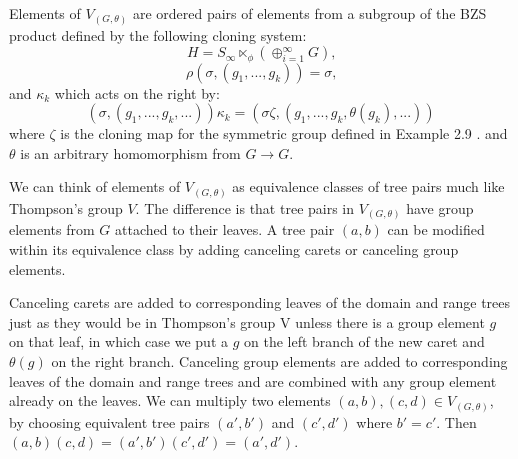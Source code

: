 \documentclass[11pt]{amsart}
\theoremstyle{plain}
\theoremstyle{remark}
\theoremstyle{definition}
\theoremstyle{remark}
\theoremstyle{named}
\begin{document}
Elements of $V_{(G,\theta)}$ are ordered pairs of elements from a subgroup of the BZS product defined by the following cloning system:
\[H = S_{\infty} \ltimes_\phi (\oplus^{\infty}_{i=1} G) \text{,}\]
\[\rho(\sigma, (g_1, ... , g_k))=\sigma \text{,}\]
 and $\kappa_k$ which acts on the right by:
\[(\sigma, (g_1, ... , g_k, ... ))\kappa_k = (\sigma \zeta,(g_1, ... , g_k, \theta(g_k), ...))\]
where $\zeta$ is the cloning map for the symmetric group defined in Example 2.9 .\cite{Witza} and $\theta$ is an arbitrary homomorphism from $G\to G$.

We can think of elements of $V_{(G,\theta)}$ as equivalence classes of tree pairs much like Thompson's group $V$. The difference is that tree pairs in $V_{(G,\theta)}$ have group elements from $G$ attached to their leaves. A tree pair $(a,b)$ can be modified within its equivalence class by adding canceling carets or canceling group elements. 

Canceling carets are added to corresponding leaves of the domain and range trees just as they would be in Thompson's group V unless there is a group element $g$ on that leaf, in which case we put a $g$ on the left branch of the new caret and $\theta(g)$ on the right branch. Canceling group elements are added to corresponding leaves of the domain and range trees and are combined with any group element already on the leaves. We can multiply two elements $(a,b), (c,d) \in V_{(G,\theta)}$, by choosing equivalent tree pairs $(a',b')$ and $(c',d')$ where $b'=c'$. Then $(a,b)(c,d)=(a',b')(c',d')=(a',d')$. 
\begin{figure}[h]
\end{figure}
\end{document}
